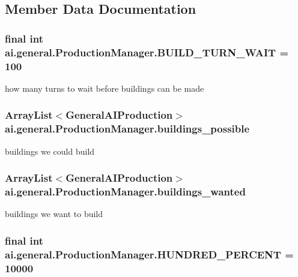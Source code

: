 \subsection{Member Data Documentation}
\hypertarget{classai_1_1general_1_1_production_manager_ae8cfbb6431211615a22e08f00559ce3a}{
\subsubsection[{BUILD\_\-TURN\_\-WAIT}]{\setlength{\rightskip}{0pt plus 5cm}final int {\bf ai.general.ProductionManager.BUILD\_\-TURN\_\-WAIT} = 100}}
\label{classai_1_1general_1_1_production_manager_ae8cfbb6431211615a22e08f00559ce3a}
how many turns to wait before buildings can be made \hypertarget{classai_1_1general_1_1_production_manager_a7f3ed3222946fb48beb16c28f4526cb5}{
\subsubsection[{buildings\_\-possible}]{\setlength{\rightskip}{0pt plus 5cm}ArrayList$<${\bf GeneralAIProduction}$>$ {\bf ai.general.ProductionManager.buildings\_\-possible}}}
\label{classai_1_1general_1_1_production_manager_a7f3ed3222946fb48beb16c28f4526cb5}
buildings we could build \hypertarget{classai_1_1general_1_1_production_manager_a739ab9ab42cb21183fcbee8fc608a133}{
\subsubsection[{buildings\_\-wanted}]{\setlength{\rightskip}{0pt plus 5cm}ArrayList$<${\bf GeneralAIProduction}$>$ {\bf ai.general.ProductionManager.buildings\_\-wanted}}}
\label{classai_1_1general_1_1_production_manager_a739ab9ab42cb21183fcbee8fc608a133}
buildings we want to build \hypertarget{classai_1_1general_1_1_production_manager_abab8287080aab2971b459ab329305aa2}{
\subsubsection[{HUNDRED\_\-PERCENT}]{\setlength{\rightskip}{0pt plus 5cm}final int {\bf ai.general.ProductionManager.HUNDRED\_\-PERCENT} = 10000}}
